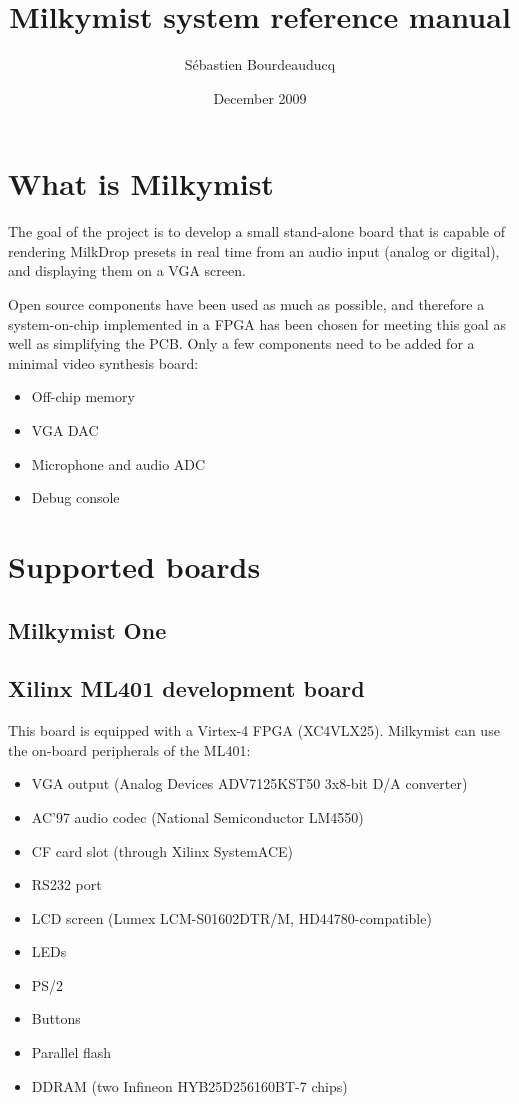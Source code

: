 \documentclass[a4paper,11pt]{article}
\title{Milkymist system reference manual}
\author{S\'ebastien Bourdeauducq}
\date{December 2009}
\begin{document}
\maketitle{}
\section{What is Milkymist}
The goal of the project is to develop a small stand-alone board that is capable of rendering MilkDrop presets in real time from an audio input (analog or digital), and displaying them on a VGA screen.

Open source components have been used as much as possible, and therefore a system-on-chip implemented in a FPGA has been chosen for meeting this goal as well as simplifying the PCB. Only a few components need to be added for a minimal video synthesis board:
\begin{itemize}
\item Off-chip memory
\item VGA DAC
\item Microphone and audio ADC
\item Debug console
\end{itemize}

\section{Supported boards}
\subsection{Milkymist One}

\subsection{Xilinx ML401 development board}
This board is equipped with a Virtex-4 FPGA (XC4VLX25). Milkymist can use the on-board peripherals of the ML401:
\begin{itemize}
\item VGA output (Analog Devices ADV7125KST50 3x8-bit D/A converter)
\item AC'97 audio codec (National Semiconductor LM4550)
\item CF card slot (through Xilinx SystemACE)
\item RS232 port
\item LCD screen (Lumex LCM-S01602DTR/M, HD44780-compatible)
\item LEDs
\item PS/2
\item Buttons
\item Parallel flash
\item DDRAM (two Infineon HYB25D256160BT-7 chips)
\end{itemize}
\end{document}
